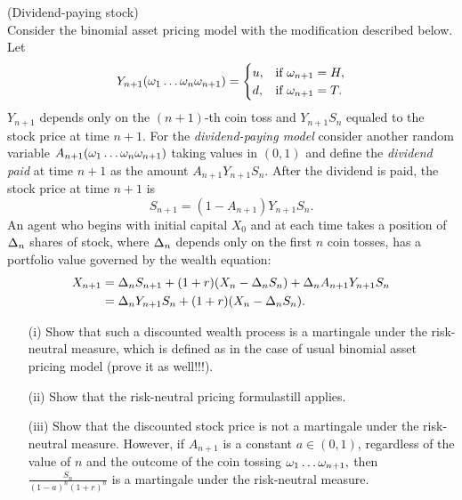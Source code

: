 \begin{problem}
 (Dividend-paying stock) \\
Consider the binomial asset pricing model
with the modification described below. Let
\[
Y_{n+1}(\omega_1\dots\omega_n\omega_{n+1})=
\begin{cases}
u,&\text{if }\omega_{n+1}=H,\\
d,&\text{if }\omega_{n+1}=T.
\end{cases}
\]
\ni $Y_{n+1}$ depends only on the $(n+1)$-th coin toss and $Y_{n+1}S_n$ equaled to the
stock price at time $n+1$. For the \emph{dividend-paying model} consider another random
variable $A_{n+1}(\omega_1\dots\omega_n\omega_{n+1})$ taking values in $(0,1)$ and define
the \emph{dividend paid} at time $n+1$ as the amount $A_{n+1}Y_{n+1}S_n.$ After the dividend
is paid, the stock price at time $n+1$ is
\[
S_{n+1}=(1-A_{n+1})Y_{n+1}S_n.
\]
\ni An agent who begins with initial capital $X_0$ and at each time takes a position of
$\Delta_n$ shares of stock, where $\Delta_n$ depends only on the first $n$ coin tosses, has
a portfolio value governed by the wealth equation:
\begin{align}
X_{n+1}&=\Delta_n S_{n+1}+(1+r) (X_n-\Delta_n S_n) +\Delta_n A_{n+1} Y_{n+1} S_n \\
&=\Delta_n Y_{n+1} S_n+(1+r)(X_n-\Delta_n S_n).
\end{align}
\begin{itemize}
\item[(i)] Show that such a discounted wealth process is a martingale under the
risk-neutral measure, which is defined as in the case of usual binomial asset pricing model
(prove it as well!!!).

\item[(ii)] Show that the risk-neutral pricing formulastill applies.

\item[(iii)] Show that the discounted stock price is not a martingale under the
risk-neutral measure. However, if $A_{n+1}$ is a constant $a\in(0,1)$, regardless of the value of
$n$  and the outcome of the coin tossing $\omega_1\dots\omega_{n+1},$ then $\frac{S_n}{(1-a)^n(1+r)^n}$ is
a martingale under the risk-neutral measure.
\end{itemize}
\end{problem} 
\begin{solution} 

\end{solution}

